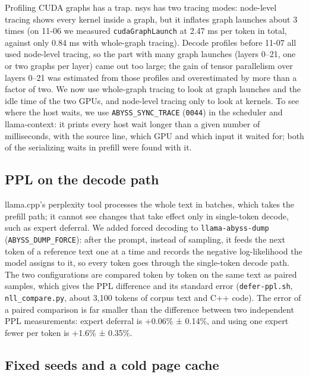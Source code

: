 \documentclass[11pt,a4paper]{article}
\newcommand{\code}[1]{\texttt{#1}}
\begin{document}
Profiling CUDA graphs has a trap. nsys has two tracing modes: node-level tracing shows every kernel inside a graph, but it inflates graph launches about 3 times (on 11-06 we measured \code{cudaGraphLaunch} at 2.47 ms per token in total, against only 0.84 ms with whole-graph tracing). Decode profiles before 11-07 all used node-level tracing, so the part with many graph launches (layers 0--21, one or two graphs per layer) came out too large; the gain of tensor parallelism over layers 0--21 was estimated from those profiles and overestimated by more than a factor of two. We now use whole-graph tracing to look at graph launches and the idle time of the two GPUs, and node-level tracing only to look at kernels. To see where the host waits, we use \code{ABYSS\_SYNC\_TRACE} (\code{0044}) in the scheduler and llama-context: it prints every host wait longer than a given number of milliseconds, with the source line, which GPU and which input it waited for; both of the serializing waits in prefill were found with it.

\subsection{PPL on the decode path}
\label{sec:forcedppl}

llama.cpp's perplexity tool processes the whole text in batches, which takes the prefill path; it cannot see changes that take effect only in single-token decode, such as expert deferral. We added forced decoding to \code{llama-abyss-dump} (\code{ABYSS\_DUMP\_FORCE}): after the prompt, instead of sampling, it feeds the next token of a reference text one at a time and records the negative log-likelihood the model assigns to it, so every token goes through the single-token decode path. The two configurations are compared token by token on the same text as paired samples, which gives the PPL difference and its standard error (\code{defer-ppl.sh}, \code{nll\_compare.py}, about 3,100 tokens of corpus text and C++ code). The error of a paired comparison is far smaller than the difference between two independent PPL measurements: expert deferral is +0.06\% ± 0.14\%, and using one expert fewer per token is +1.6\% ± 0.35\%.

\subsection{Fixed seeds and a cold page cache}
\label{sec:seeds}
\end{document}
